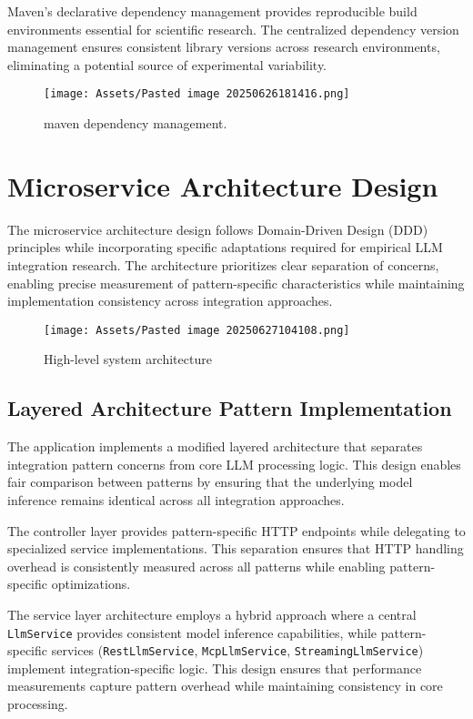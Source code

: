Maven's declarative dependency management provides reproducible build environments essential for scientific research. The centralized dependency version management ensures consistent library versions across research environments, eliminating a potential source of experimental variability.

\begin{figure}[H]
    \centering
    \texttt{[image: Assets/Pasted image 20250626181416.png]}
    \caption{maven dependency management. \cite{SpringBoot,SpringAI}}
\end{figure}

\section{Microservice Architecture Design}

The microservice architecture design follows Domain-Driven Design (DDD) principles while incorporating specific adaptations required for empirical LLM integration research. The architecture prioritizes clear separation of concerns, enabling precise measurement of pattern-specific characteristics while maintaining implementation consistency across integration approaches.

\begin{figure}[H]
    \centering
    \texttt{[image: Assets/Pasted image 20250627104108.png]}
    \caption{High-level system architecture}
\end{figure}

\subsection{Layered Architecture Pattern Implementation}

The application implements a modified layered architecture that separates integration pattern concerns from core LLM processing logic. This design enables fair comparison between patterns by ensuring that the underlying model inference remains identical across all integration approaches.

The controller layer provides pattern-specific HTTP endpoints while delegating to specialized service implementations. This separation ensures that HTTP handling overhead is consistently measured across all patterns while enabling pattern-specific optimizations.

The service layer architecture employs a hybrid approach where a central \texttt{LlmService} provides consistent model inference capabilities, while pattern-specific services (\texttt{RestLlmService}, \texttt{McpLlmService}, \texttt{StreamingLlmService}) implement integration-specific logic. This design ensures that performance measurements capture pattern overhead while maintaining consistency in core processing.

